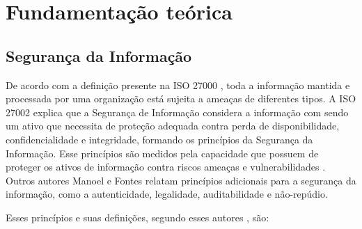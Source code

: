 \chapter{\label{chap:intro}Fundamentação teórica}

\section{Segurança da Informação}

De acordo com a definição presente na ISO 27000 \cite{ISO27000}, toda a informação mantida e processada por uma organização está sujeita a ameaças de diferentes tipos. A ISO 27002 explica que a Segurança de Informação considera a informação com sendo um ativo que necessita de proteção adequada contra perda de disponibilidade, confidencialidade e integridade, formando os princípios da Segurança da Informação. Esse princípios são medidos pela capacidade que possuem de proteger os ativos de informação contra riscos ameaças e vulnerabilidades  \cite{hintzbergen2018fundamentos}. Outros autores  Manoel \cite{da2014governancca} e Fontes \cite{fontes2017segurancca}  relatam  princípios adicionais para a segurança da informação, como a autenticidade, legalidade, auditabilidade e não-repúdio. 

Esses princípios e suas definições, segundo esses autores \cite{da2014governancca,fontes2017segurancca}, são:


